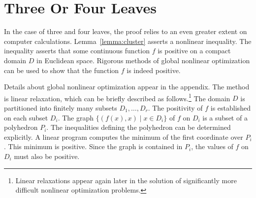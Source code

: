 %
%
%



\section{Three Or Four Leaves}\label{sec:3or4}

In the case of three and four leaves, the proof relies to an even
greater extent on computer calculations.  
Lemma~\ref{lemma:cluster} asserts a nonlinear inequality.  The inequality
asserts that some continuous function $f$ is positive on a compact
domain $D$ in Euclidean space.  Rigorous methods of global nonlinear
optimization can be used to show that the function $f$ is indeed
positive.

Details about global nonlinear optimization appear in the appendix.
The method is linear relaxation, which can be briefly described as
follows.\footnote{Linear relaxations appear again later in the
solution of significantly more difficult nonlinear optimization
problems.}  The domain $D$ is partitioned into finitely many subsets
$D_1,\ldots, D_r$.  The positivity of $f$ is established on each
subset $D_i$.  The graph $\{(f(x), x)\mid x\in D_i\}$ of $f$ on $D_i$
is a subset of a polyhedron $P_i$.  The inequalities defining the
polyhedron can be determined explicitly.  A linear program computes
the minimum of the first coordinate over $P_i$.  This minimum is
positive.  Since the graph is contained in $P_i$, the values of $f$ on
$D_i$ must also be positive.

